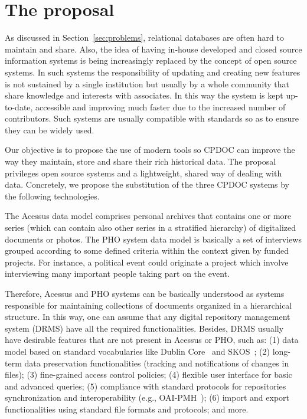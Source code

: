 \section{The proposal}\label{sec:proposal}

As discussed in Section~\ref{sec:problems}, relational databases are
often hard to maintain and share. Also, the idea of having in-house
developed and closed source information systems is being increasingly
replaced by the concept of open source systems. In such systems the
responsibility of updating and creating new features is not sustained
by a single institution but usually by a whole community that share
knowledge and interests with associates. In this way the system is
kept up-to-date, accessible and improving much faster due to the
increased number of contributors. Such systems are usually compatible
with standards so as to ensure they can be widely used.

Our objective is to propose the use of modern tools so CPDOC can improve the way
they maintain, store and share their rich historical data. The proposal
privileges open source systems and a lightweight, shared way of
dealing with data. Concretely, we propose the substitution of the
three CPDOC systems by the following technologies.


The Acessus data model comprises personal
archives that contains one or more series (which can contain also
other series in a stratified hierarchy) of digitalized documents or
photos. The PHO system data model is basically a set of
interviews grouped according to some defined criteria within the
context given by funded projects. For instance, a political event
could originate a project which involve interviewing many important
people taking part on the event.

Therefore, Acessus and PHO systems can be basically understood as systems
responsible for maintaining collections of documents organized in a
hierarchical structure. In this way, one can assume that any digital
repository management system (DRMS) have all the required
functionalities. Besides, DRMS usually have desirable features that are not
present in Acessus or PHO, such as: (1) data model based on standard
vocabularies like Dublin Core~\cite{dc} and SKOS~\cite{skos}; (2)
long-term data preservation functionalities (tracking and
notifications of changes in files); (3) fine-grained access control
policies; (4) flexible user interface for basic and advanced queries;
(5) compliance with standard protocols for repositories
synchronization and interoperability (e.g., OAI-PMH~\cite{oai}); (6)
import and export functionalities using standard file formats and
protocols; and more.


